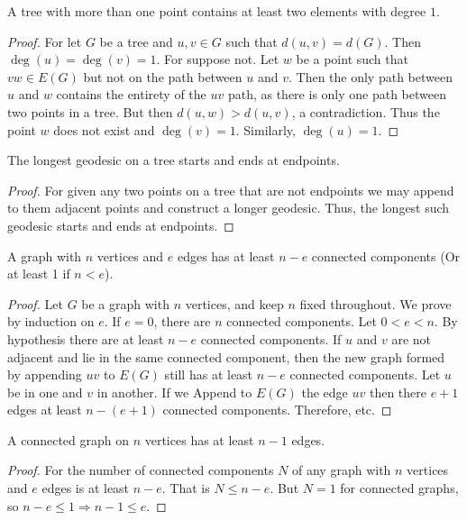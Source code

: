 \documentclass[crop=false,class=book,oneside]{standalone}
\begin{document}
        \begin{corollary}
        A tree with more than one point contains at least two elements with degree $1$.
        \end{corollary}
        \begin{proof}
        For let $G$ be a tree and $u,v\in G$ such that $d(u,v) = d(G)$. Then $\deg(u) = \deg(v) = 1$. For suppose not. Let $w$ be a point such that $vw\in E(G)$ but not on the path between $u$ and $v$. Then the only path between $u$ and $w$ contains the entirety of the $uv$ path, as there is only one path between two points in a tree. But then $d(u,w)>d(u,v)$, a contradiction. Thus the point $w$ does not exist and $\deg(v)=1$. Similarly, $\deg(u)=1$.
        \end{proof}
        \begin{corollary}
        The longest geodesic on a tree starts and ends at endpoints.
        \end{corollary}
        \begin{proof}
        For given any two points on a tree that are not endpoints we may append to them adjacent points and construct a longer geodesic. Thus, the longest such geodesic starts and ends at endpoints.
        \end{proof}
        \begin{lemma}
        A graph with $n$ vertices and $e$ edges has at least $n-e$ connected components (Or at least 1 if $n<e$).
        \end{lemma}
        \begin{proof}
        Let $G$ be a graph with $n$ vertices, and keep $n$ fixed throughout. We prove by induction on $e$. If $e=0$, there are $n$ connected components. Let $0<e < n$. By hypothesis there are at least $n-e$ connected components. If $u$ and $v$ are not adjacent and lie in the same connected component, then the new graph formed by appending $uv$ to $E(G)$ still has at least $n-e$ connected components. Let $u$ be in one and $v$ in another. If we Append to $E(G)$ the edge $uv$ then there $e+1$ edges at least $n-(e+1)$ connected components. Therefore, etc.
        \end{proof}
        \begin{corollary}
        A connected graph on $n$ vertices has at least $n-1$ edges.
        \end{corollary}
        \begin{proof}
        For the number of connected components $N$ of any graph with $n$ vertices and $e$ edges is at least $n-e$. That is $N\leq n-e$. But $N=1$ for connected graphs, so $n-e\leq 1 \Rightarrow n-1\leq e$.
        \end{proof}
\end{document}
